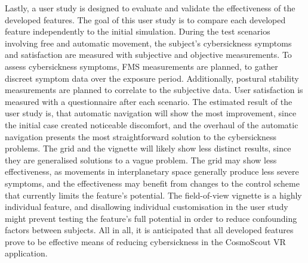Lastly, a user study is designed to evaluate and validate the effectiveness of the developed features.
The goal of this user study is to compare each developed feature independently to the initial simulation.
During the test scenarios involving free and automatic movement, the subject's cybersickness symptoms and satisfaction
are measured with subjective and objective measurements.
To assess cybersickness symptoms, FMS measurements are planned, to gather discreet symptom data over the exposure
period.
Additionally, postural stability measurements are planned to correlate to the subjective data.
User satisfaction is measured with a questionnaire after each scenario.
The estimated result of the user study is, that automatic navigation will show the most improvement, since the
initial case created noticeable discomfort, and the overhaul of the automatic navigation presents the most
straightforward solution to the cybersickness problems.
The grid and the vignette will likely show less distinct results, since they are generalised solutions to a vague
problem.
The grid may show less effectiveness, as movements in interplanetary space generally produce less severe symptoms, and
the effectiveness may benefit from changes to the control scheme that currently limits the feature's potential.
The field-of-view vignette is a highly individual feature, and disallowing individual customisation in the user study
might prevent testing the feature's full potential in order to reduce confounding factors between subjects.
All in all, it is anticipated that all developed features prove to be effective means of reducing cybersickness in the
CosmoScout VR application.
